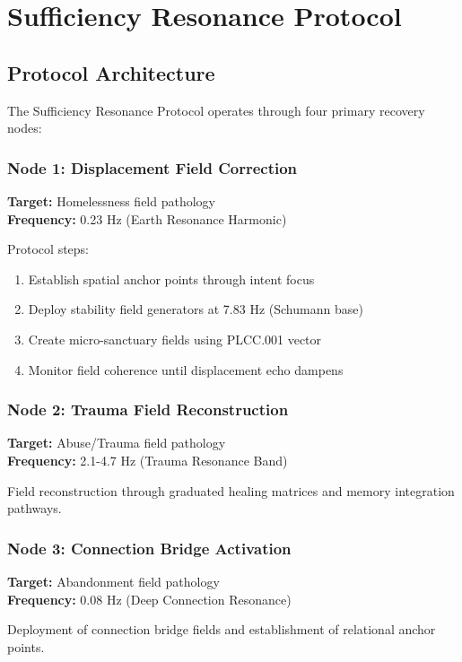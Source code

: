 \documentclass[12pt,a4paper]{article}
\begin{document}
\section{Sufficiency Resonance Protocol}

\subsection{Protocol Architecture}

The Sufficiency Resonance Protocol operates through four primary recovery nodes:

\subsubsection{Node 1: Displacement Field Correction}
\textbf{Target:} Homelessness field pathology \\
\textbf{Frequency:} 0.23 Hz (Earth Resonance Harmonic)

Protocol steps:
\begin{enumerate}
    \item Establish spatial anchor points through intent focus
    \item Deploy stability field generators at 7.83 Hz (Schumann base)
    \item Create micro-sanctuary fields using PLCC.001 vector
    \item Monitor field coherence until displacement echo dampens
\end{enumerate}

\subsubsection{Node 2: Trauma Field Reconstruction}
\textbf{Target:} Abuse/Trauma field pathology \\
\textbf{Frequency:} 2.1-4.7 Hz (Trauma Resonance Band)

Field reconstruction through graduated healing matrices and memory integration pathways.

\subsubsection{Node 3: Connection Bridge Activation}
\textbf{Target:} Abandonment field pathology \\
\textbf{Frequency:} 0.08 Hz (Deep Connection Resonance)

Deployment of connection bridge fields and establishment of relational anchor points.
\end{document}
